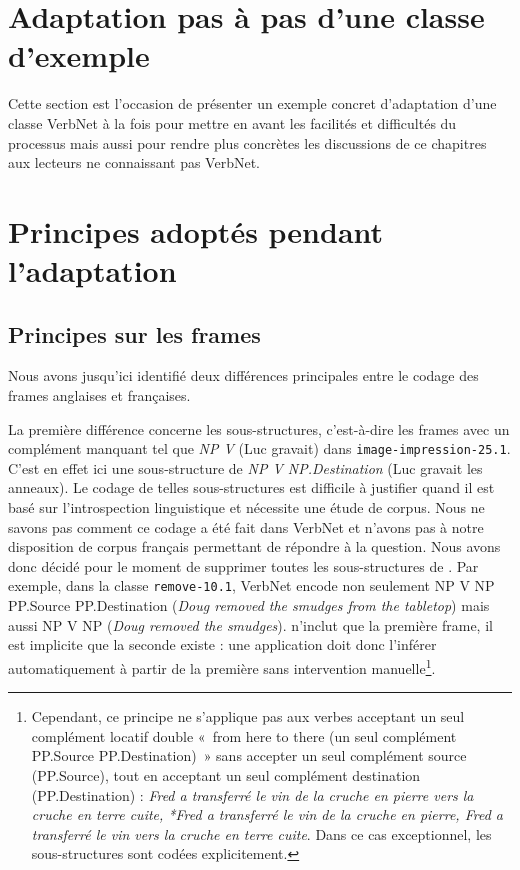 \section{Adaptation pas à pas d'une classe d'exemple}

Cette section est l'occasion de présenter un exemple concret d'adaptation d'une
classe VerbNet à la fois pour mettre en avant les facilités et difficultés du
processus mais aussi pour rendre plus concrètes les discussions de ce chapitres
aux lecteurs ne connaissant pas VerbNet.

\section{Principes adoptés pendant l'adaptation}

\subsection{Principes sur les frames}\label{princp}

Nous avons jusqu'ici identifié deux différences principales entre le codage des
frames anglaises et françaises.

La première différence concerne les sous-structures, c'est-à-dire les frames
avec un complément manquant tel que \textit{NP V} (Luc gravait) dans
{\color{blue}\texttt{image-impression-25.1}}. C'est en effet ici une
sous-structure de \textit{NP V NP.Destination} (Luc gravait les anneaux). Le
codage de telles sous-structures est difficile à justifier quand il est basé
sur l'introspection linguistique et nécessite une étude de corpus. Nous ne
savons pas comment ce codage a été fait dans VerbNet et n'avons pas à notre
disposition de corpus français permettant de répondre à la question. Nous avons
donc décidé pour le moment de supprimer toutes les sous-structures de
\verbenet{}. Par exemple, dans la classe {\color{blue}\texttt{remove-10.1}},
VerbNet encode non seulement NP V NP PP.Source PP.Destination (\textit{Doug
removed the smudges from the tabletop}) mais aussi NP V NP (\textit{Doug removed
the smudges}). \verbenet{} n'inclut que la première frame, il est implicite que
la seconde existe : une application doit donc l'inférer automatiquement à
partir de la première sans intervention manuelle\footnote{Cependant, ce
    principe ne s'applique pas aux verbes acceptant un seul complément locatif
    double «~from here to there (un seul complément PP.Source PP.Destination)~»
    sans accepter un seul complément source (PP.Source), tout en acceptant un
    seul complément destination (PP.Destination) : \textit{Fred a transferré le
        vin de la cruche en pierre vers la cruche en terre cuite, *Fred a
        transferré le vin de la cruche en pierre, Fred a transferré le vin vers
        la cruche en terre cuite}. Dans ce cas exceptionnel, les
    sous-structures sont codées explicitement.}.

